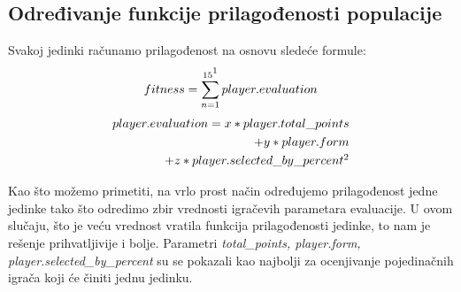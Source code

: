 \documentclass[a4paper]{article}
\begin{document}
\subsection{Određivanje funkcije prilagođenosti populacije}
\label{sec:playerEvaluacija}
Svakoj jedinki računamo prilagođenost na osnovu sledeće formule: 
	\begin{gather*}
		 fitness = \sum_{n=1}^{15 \footnotemark } player.evaluation \\
	\end{gather*}
	\begin{gather*}
		\begin{aligned}
		player.evaluation = x*player.total\_points \\ + y*player.form \\ + z*player.selected\_by\_percent \footnotemark \\
		\end{aligned}
	\end{gather*}

Kao što možemo primetiti, na vrlo prost način određujemo prilagođenost jedne jedinke tako što odredimo zbir vrednosti igračevih parametara evaluacije. U ovom slučaju, što je veću vrednost vratila funkcija prilagođenosti jedinke, to nam je rešenje prihvatljivije i bolje. Parametri \textit{total\_points, player.form, player.selected\_by\_percent} su se pokazali kao najbolji za ocenjivanje pojedinačnih igrača koji će činiti jednu jedinku.
\end{document}
